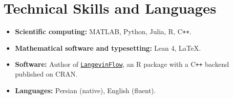 \documentclass[11pt,letterpaper]{article}
\begin{document}
\section{Technical Skills and Languages}

\begin{itemize}
  \item \textbf{Scientific computing:}
        MATLAB, Python, Julia, R, C\texttt{++}.
  \item \textbf{Mathematical software and typesetting:} Lean 4, \LaTeX.
  \item \textbf{Software:}
        Author of
        \href{https://CRAN.R-project.org/package=LangevinFlow}
             {\texttt{LangevinFlow}}, an R package with a C\texttt{++} backend
        published on CRAN.
  \item \textbf{Languages:} Persian (native), English (fluent).
\end{itemize}
\end{document}
